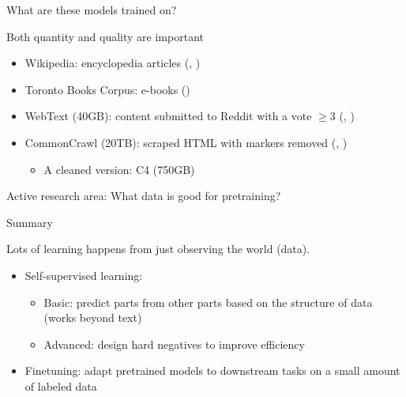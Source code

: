 \documentclass[usenames,dvipsnames,notes,11pt,aspectratio=169,hyperref={colorlinks=true, linkcolor=blue}]{beamer}
\begin{document}
\begin{frame}
    {What are these models trained on?}

    Both quantity and quality are important
    \begin{itemize}
        \item Wikipedia: encyclopedia articles (, )
        \item Toronto Books Corpus: e-books () 
        \item WebText (40GB): content submitted to Reddit with a vote $\ge 3$ (, ) 
        \item CommonCrawl (20TB): scraped HTML with markers removed (, )
            \begin{itemize}
                \item A cleaned version: C4 (750GB)
            \end{itemize}
    \end{itemize}

    Active research area: What data is good for pretraining? 
\end{frame}

\begin{frame}
    {Summary}

    Lots of learning happens from just observing the world (data).
    \begin{itemize}
        \item Self-supervised learning: 
            \begin{itemize}
                \item Basic: predict parts from other parts based on the structure of data (works beyond text)
                \item Advanced: design hard negatives to improve efficiency
            \end{itemize}
        \item Finetuning: adapt pretrained models to downstream tasks on a small amount of labeled data
    \end{itemize}
\end{frame}
\end{document}
